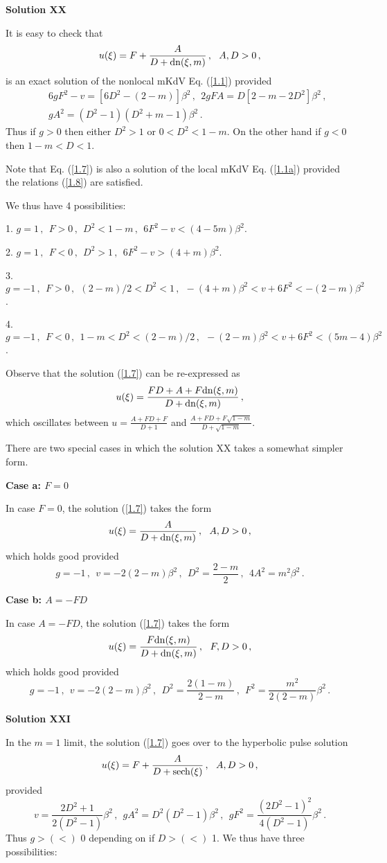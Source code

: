 \documentclass[11pt]{article}
\newcommand{\be}{\begin{equation}}
\newcommand{\ee}{\end{equation}}
\newcommand{\bea}{\begin{eqnarray}}
\newcommand{\eea}{\end{eqnarray}}
\newcommand{\dn}{{\rm dn}}
\newcommand{\sech}{{\rm sech}}
\begin{document}
{\bf Solution XX}

It is easy to check that
\be\label{1.7}
u(\xi) = F + \frac{A}{D+\dn(\xi,m)}\,,~~A, D > 0\,,
\ee
is an exact solution of the nonlocal mKdV Eq. (\ref{1.1}) provided
\bea\label{1.8}
&&6g F^2-v = [6D^2 -(2-m)]\beta^2\,,~~2g FA =D[2-m-2D^2]\beta^2\,,
\nonumber \\
&&g A^2 = (D^2-1)(D^2+m-1) \beta^2\,.
\eea
Thus if $g > 0$ then either $D^2 > 1$ or $0 < D^2 < 1-m$. On the other
hand if $g < 0$ then $1-m < D < 1$. 

Note that Eq. (\ref{1.7}) is also a solution of the local mKdV 
Eq. (\ref{1.1a}) provided the relations (\ref{1.8}) are satisfied.

We thus have 4 possibilities:

1. $g = 1\,,~~F> 0\,,~~D^2 < 1-m\,,~~6 F^2 -v < (4-5m)\beta^2$.

2. $g = 1\,,~~F < 0\,,~~D^2 > 1\,,~~6F^2 -v > (4+m)\beta^2$.

3. $g = -1\,,~~F > 0\,,~~(2-m)/2 < D^2 < 1\,,~~-(4+m)\beta^2 < v+6F^2 
< -(2-m) \beta^2$.

4. $g = -1\,,~~F < 0\,,~~1-m < D^2 < (2-m)/2\,,~~-(2-m)\beta^2 < v+6F^2 
< (5m-4) \beta^2$.

Observe that the solution (\ref{1.7}) can be re-expressed as
\be\label{1.9}
u(\xi) = \frac{FD+A+F\dn(\xi,m)}{D+\dn(\xi,m)}\,,
\ee
which oscillates between $u = \frac{A+FD+F}{D+1}$ and 
$\frac{A+FD+F\sqrt{1-m}}{D+\sqrt{1-m}}$. 

There are two special cases in
which the solution XX takes a somewhat simpler form.

{\bf Case a: $F = 0$}

In case $F =0$, the solution (\ref{1.7}) takes the form
\be\label{1.10}
u(\xi) = \frac{A}{D+\dn(\xi,m)}\,,~~A, D > 0\,,
\ee
which holds good provided
\be\label{1.11}
g = -1\,,~~v = -2(2-m)\beta^2\,,~~D^2 = \frac{2-m}{2}\,,~~
4 A^2 = m^2 \beta^2\,.
\ee

{\bf Case b: $A = -FD$}

In case $A = -FD$, the solution (\ref{1.7}) takes the form
\be\label{1.12}
u(\xi) = \frac{F\dn(\xi,m)}{D+\dn(\xi,m)}\,,~~F, D > 0\,,
\ee
which holds good provided
\be\label{1.13}
g = -1\,,~~v = -2(2-m)\beta^2\,,~~D^2 = \frac{2(1-m)}{2-m}\,,~~
 F^2 = \frac{m^2}{2(2-m)} \beta^2\,.
\ee

{\bf Solution XXI}

In the $m = 1$ limit, the solution (\ref{1.7}) goes over to the 
hyperbolic pulse solution
\be\label{1.14}
u(\xi) = F+\frac{A}{D+\sech(\xi)}\,,~~A, D > 0\,,
\ee
provided
\be\label{1.15}
v = \frac{2D^2+1}{2(D^2-1)}\beta^2\,,~~g A^2 = D^2(D^2-1)\beta^2\,,~~
g F^2 = \frac{(2D^2-1)^2}{4(D^2-1)}\beta^2\,.
\ee
Thus $g > (<)$ 0 depending on if $D > (<)$ 1. 
We thus have three possibilities:
\end{document}
